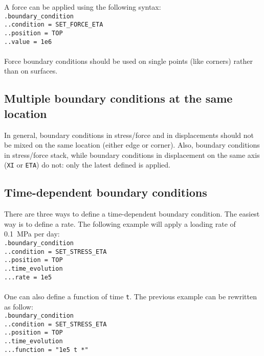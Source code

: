 \documentclass[10pt]{article}
\begin{document}
A force can be applied using the following syntax:\\

\noindent \verb+.boundary_condition+\\
\verb+..condition = SET_FORCE_ETA+\\
\verb+..position = TOP+\\
\verb+..value = 1e6+

\paragraph{}Force boundary conditions should be used on single points (like corners) rather than on surfaces.

\subsection{Multiple boundary conditions at the same location}

In general, boundary conditions in stress/force and in displacements should not be mixed on the same location (either edge or corner). Also, boundary conditions in stress/force stack, while boundary conditions in displacement on the same axis (\verb+XI+ or \verb+ETA+) do not: only the latest defined is applied.

\subsection{Time-dependent boundary conditions}

There are three ways to define a time-dependent boundary condition. The easiest way is to define a rate. The following example will apply a loading rate of 0.1~MPa per day:\\

\noindent \verb+.boundary_condition+\\
\verb+..condition = SET_STRESS_ETA+\\
\verb+..position = TOP+\\
\verb+..time_evolution+\\
\verb+...rate = 1e5+

\paragraph{}One can also define a function of time \verb+t+. The previous example can be rewritten as follow:\\

\noindent \verb+.boundary_condition+\\
\verb+..condition = SET_STRESS_ETA+\\
\verb+..position = TOP+\\
\verb+..time_evolution+\\
\verb+...function = "1e5 t *"+
\end{document}

